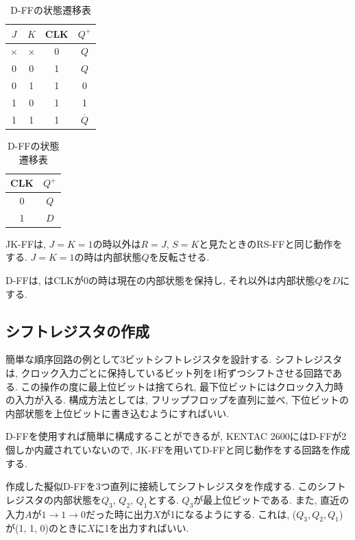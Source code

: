 \documentclass[titlepage]{jsarticle}
\begin{document}
    \begin{table}[h]
      \begin{minipage}{0.49\hsize}
        \centering
        \caption{JK-FFの状態遷移表}
        \begin{tabular}{ccc||c}
          \hline
          $J$ & $K$ & CLK & $Q^+$ \\ \hline \hline
          $\times$ & $\times$ & 0 & $Q$ \\
          0 & 0 & 1 & $Q$ \\
          0 & 1 & 1 & 0 \\
          1 & 0 & 1 & 1 \\
          1 & 1 & 1 & $\overline{Q}$ \\ \hline
        \end{tabular}
      \end{minipage}
      \begin{minipage}{0.49\hsize}
        \centering
        \caption{D-FFの状態遷移表}
        \begin{tabular}{c||c}
          \hline
          CLK & $Q^+$ \\ \hline \hline
          0 & $Q$ \\
          1 & $D$ \\ \hline
        \end{tabular}
      \end{minipage}
    \end{table}

    JK-FFは, $J = K = 1$の時以外は$R = J$, $S = K$と見たときのRS-FFと同じ動作をする.
    $J = K = 1$の時は内部状態$Q$を反転させる.

    D-FFは, はCLKが0の時は現在の内部状態を保持し, それ以外は内部状態$Q$を$D$にする.
  \subsection{シフトレジスタの作成}
    簡単な順序回路の例として3ビットシフトレジスタを設計する.
    シフトレジスタは, クロック入力ごとに保持しているビット列を1桁ずつシフトさせる回路である.
    この操作の度に最上位ビットは捨てられ, 最下位ビットにはクロック入力時の入力が入る.
    構成方法としては, フリップフロップを直列に並べ, 下位ビットの内部状態を上位ビットに書き込むようにすればいい.

    D-FFを使用すれば簡単に構成することができるが, KENTAC 2600にはD-FFが2個しか内蔵されていないので,
    JK-FFを用いてD-FFと同じ動作をする回路を作成する.

    作成した擬似D-FFを3つ直列に接続してシフトレジスタを作成する.
    このシフトレジスタの内部状態を$Q_3$, $Q_2$, $Q_1$とする.
    $Q_3$が最上位ビットである.
    また, 直近の入力$A$が$1 \rightarrow 1 \rightarrow 0$だった時に出力$X$が1になるようにする.
    これは, ($Q_3, Q_2, Q_1$)が(1, 1, 0)のときに$X$に1を出力すればいい.
\end{document}
